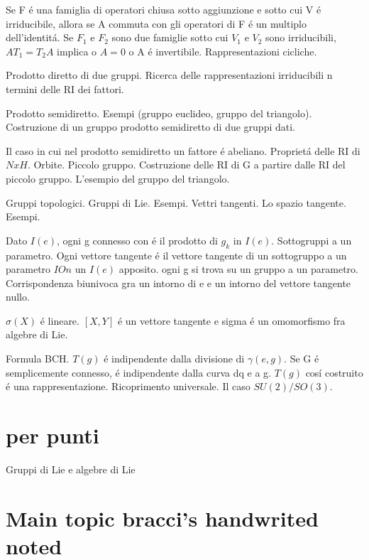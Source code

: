 \documentclass[oneside,12pt]{memoir}
\begin{document}
Se F \'e una famiglia di operatori chiusa sotto aggiunzione e sotto cui V \'e irriducibile, allora se A commuta con gli operatori di F \'e un multiplo dell'identit\'a. Se $F_1$ e $F_2$ sono due famiglie sotto cui $V_1$ e $V_2$ sono irriducibili, $AT_1=T_2A$ implica o $A=0$ o A \'e invertibile. Rappresentazioni cicliche.

Prodotto diretto di due gruppi. Ricerca delle rappresentazioni irriducibili n termini delle RI dei fattori.

Prodotto semidiretto. Esempi (gruppo euclideo, gruppo del triangolo). Costruzione di un gruppo prodotto semidiretto di due gruppi dati.

  Il caso in cui nel prodotto semidiretto un fattore \'e abeliano. Propriet\'a delle RI di $NxH$. Orbite. Piccolo gruppo. Costruzione delle RI di G a partire dalle RI del piccolo gruppo. L'esempio del gruppo del triangolo.

Gruppi topologici. Gruppi di Lie. Esempi. Vettri tangenti. Lo spazio tangente. Esempi.

Dato $I(e)$, ogni g connesso con \'e il prodotto di $g_k$ in $I(e)$. Sottogruppi a un parametro. Ogni vettore tangente \'e il vettore tangente di un sottogruppo a un parametro $IOn$ un $I(e)$ apposito. ogni g si trova su un gruppo a un parametro. Corrispondenza biunivoca gra un intorno di e e un intorno del vettore tangente nullo.

$\sigma(X)$ \'e lineare. $[X,Y]$ \'e un vettore tangente e sigma \'e un omomorfismo fra algebre di Lie.

Formula BCH. $T(g)$ \'e indipendente dalla divisione di $\gamma(e,g)$. Se G \'e semplicemente connesso, \'e indipendente dalla curva dq e a g. $T(g)$ cos\'i costruito \'e una rappresentazione. Ricoprimento universale. Il caso $SU(2)/SO(3)$.


\chapter{per punti}
\PartialToc

\begin{itemize*}
\item Gruppi di Lie e algebre di Lie
\end{itemize*}

\chapter{Main topic  bracci's handwrited noted}
\PartialToc
\end{document}
